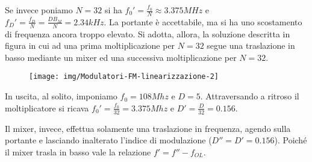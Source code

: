 Se invece poniamo $N=32$  si ha $f_0' = \frac{f_0}{N} \approx 3.375MHz$ e $f_D' = \frac{f_D}{N} = \frac{D B_M}{N} = 2.34kHz$. La portante è accettabile, ma si ha uno scostamento di frequenza ancora troppo elevato.
Si adotta, allora, la soluzione descritta in figura in cui ad una prima moltiplicazione per $N = 32$ segue una traslazione in basso mediante un mixer ed una successiva moltiplicazione per $N=32$.

\begin{figure}[hb]
\centering
\texttt{[image: img/Modulatori-FM-linearizzazione-2]}
\caption{}
\label{fig:modulazionefmpiumeglio-2}
\end{figure}

In uscita, al solito, imponiamo $f_0 = 108Mhz$ e $D = 5$. Attraversando a ritroso il moltiplicatore si ricava $f_{0}' = \frac{f_0}{32} = 3.375Mhz$ e $D' = \frac{D}{32} = 0.156$.

Il mixer, invece, effettua solamente una traslazione in frequenza, agendo sulla portante e lasciando inalterato l'indice di modulazione ($D'' = D' = 0.156$). Poiché il mixer trasla in basso vale la relazione $f' =  f''- f_{OL}$.

